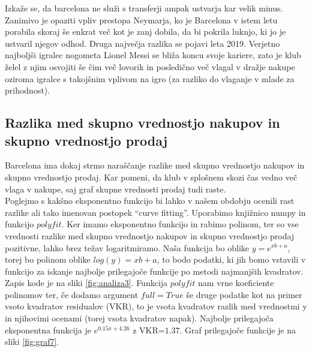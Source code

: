 \documentclass[a4paper, 12pt]{article}
\begin{document}
Izkaže se, da barcelona ne služi s transferji ampak ustvarja kar velik minus.
Zanimivo je opaziti vpliv prestopa Neymarja, ko je Barcelona v istem letu porabila skoraj še enkrat več kot je zanj dobila, da bi pokrila luknjo, ki jo je ustvaril njegov odhod.
Druga največja razlika se pojavi leta 2019. Verjetno najboljši igralec nogometa Lionel Messi se bliža koncu svoje kariere, zato je klub želel z njim osvojiti še čim več lovorik in posledično več vlagal v dražje nakupe oziroma igralce s takojšnim vplivom na igro (za razliko do vlaganje v mlade za prihodnost). 

\subsection{Razlika med skupno vrednostjo nakupov in skupno vrednostjo prodaj}
Barcelona ima dokaj strmo naraščanje razlike med skupno vrednostjo nakupov in skupno vrednostjo prodaj. Kar pomeni, da klub v splošnem skozi čas vedno več vlaga v nakupe, saj graf skupne vrednosti prodaj tudi raste. \\

Poglejmo s kakšno eksponentno funkcijo bi lahko v našem obdobju ocenili rast razlike ali tako imenovan postopek ``curve fitting''. Uporabimo knjižnico numpy in funkcijo $polyfit$. 
Ker imamo eksponentno funkcijo in rabimo polinom, ter so vse vrednosti razlike med skupno vrednostjo nakupov in skupno vrednostjo prodaj pozitivne, lahko brez težav logaritmiramo.
Naša funkcija bo oblike $y=e^{xb+a}$, torej bo polinom oblike $log(y)=xb+a$, to bodo podatki, ki jih bomo vstavili v funkcijo za iskanje najbolje prilegajoče funkcije po metodi najmanjših kvadratov. Zapis kode je na sliki \ref{fig:analiza3}. Funkcija $polyfit$ nam vrne koeficiente polinomov ter, če dodamo argument $full=True$ še druge podatke kot na primer vsoto kvadratov residualov (VKR), to je vsota kvadratov razlik med vrednostmi y in njihovimi ocenami (torej vsota kvadratov napak). 
Najbolje prilegajoča eksponentna funkcija je $e^{0.15x+4.26}$ z VKR=$1.37$. Graf prilegajoče funkcije je na sliki \ref{fig:graf7}.
\end{document}
